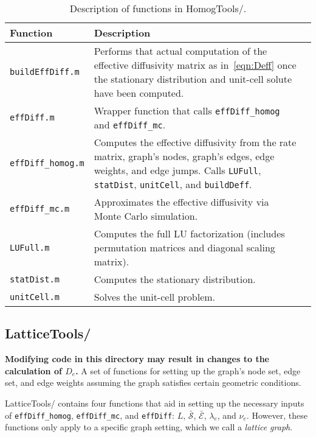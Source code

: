 \documentclass[11pt, oneside]{article}   	%
\theoremstyle{definition}
\newcommand\sS{\mathcal{S}}
\newcommand\sE{\mathcal{E}}
\newcommand\oS{\bar{\sS}}
\newcommand\oE{\bar{\sE}}
\begin{document}
\begin{table}[h]
\centering
\begin{tabularx}{\linewidth}{lLL} %
	\toprule
	Function     & Description \\
	\midrule
	\texttt{buildEffDiff.m} & Performs that actual computation of the effective diffusivity matrix as in~\eqref{eqn:Deff} once the stationary distribution and unit-cell solute have been computed. \\ \hline
	\texttt{effDiff.m} & Wrapper function that calls \texttt{effDiff\_homog} and \texttt{effDiff\_mc}. \\ \hline
	\texttt{effDiff\_homog.m} & Computes the effective diffusivity from the rate matrix, graph's nodes, graph's edges, edge weights, and edge jumps. Calls \texttt{LUFull}, \texttt{statDist}, \texttt{unitCell}, and \texttt{buildDeff}. \\ \hline
	\texttt{effDiff\_mc.m} & Approximates the effective diffusivity via Monte Carlo simulation. \\ \hline
	\texttt{LUFull.m} & Computes the full LU factorization (includes permutation matrices and diagonal scaling matrix). \\ \hline
	\texttt{statDist.m} & Computes the stationary distribution. \\ \hline
	\texttt{unitCell.m} & Solves the unit-cell problem. \\
	\bottomrule
\end{tabularx}
\caption{Description of functions in HomogTools/.}
\end{table}

\subsection{LatticeTools/}
{\bf Modifying code in this directory may result in changes to the calculation of $D_e$.} A set of functions for setting up the graph's node set, edge set, and edge weights assuming the graph satisfies certain geometric conditions.

LatticeTools/ contains four functions that aid in setting up the necessary inputs of \texttt{effDiff\_homog}, \texttt{effDiff\_mc}, and \texttt{effDiff}: $L$, $\oS$, $\oE$, $\lambda_e$, and $\nu_e$. However, these functions only apply to a specific graph setting, which we call a \emph{lattice graph}.
\end{document}
